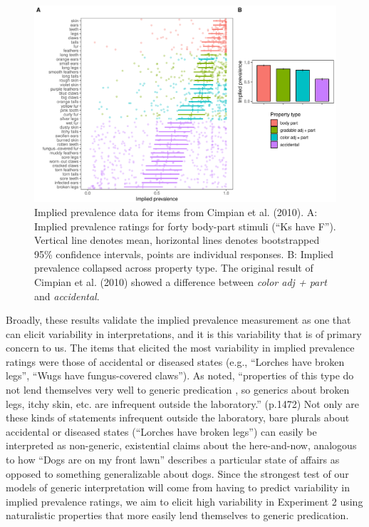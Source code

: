\documentclass[floatsintext,doc]{apa6}
\begin{document}
\begin{figure}
\centering
\includegraphics{figs/cimpian-results}
\caption{\label{fig:cimpian-modelingResults}Implied prevalence data for items from Cimpian et al. (2010). A: Implied prevalence ratings for forty body-part stimuli (\enquote{Ks have F}). Vertical line denotes mean, horizontal lines denotes bootstrapped 95\% confidence intervals, points are individual responses. B: Implied prevalence collapsed across property type. The original result of Cimpian et al. (2010) showed a difference between \emph{color adj + part} and \emph{accidental}.}
\end{figure}

Broadly, these results validate the implied prevalence measurement as one that can elicit variability in interpretations, and it is this variability that is of primary concern to us.
The items that elicited the most variability in implied prevalence ratings were those of accidental or diseased states (e.g., \enquote{Lorches have broken legs}, \enquote{Wugs have fungus-covered claws}).
As  noted, \enquote{properties of this type do not lend themselves very well to generic predication \cite{gelman1988development, Cimpian2008}, so generics about broken legs, itchy skin, etc. are infrequent outside the laboratory.} (p.1472)
Not only are these kinds of statements infrequent outside the laboratory, bare plurals about accidental or diseased states (\enquote{Lorches have broken legs}) can easily be interpreted as non-generic, existential claims about the here-and-now, analogous to how \enquote{Dogs are on my front lawn} describes a particular state of affairs as opposed to something generalizable about dogs.
Since the strongest test of our models of generic interpretation will come from having to predict variability in implied prevalence ratings, we aim to elicit high variability in Experiment 2 using naturalistic properties that more easily lend themselves to generic predication.
\end{document}
